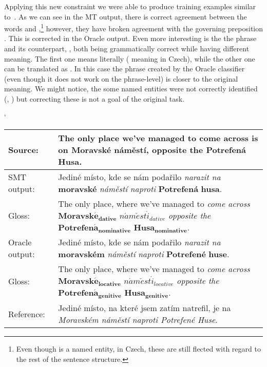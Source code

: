 Applying this new constraint we were able to produce training examples similar to~.
As we can see in the MT output, there is correct agreement between the words  and ,\footnote{
Even though  is a named entity, in Czech, these are still flected with regard to the rest of the sentence
structure.} however, they have broken agreement with the governing preposition . This is corrected in the Oracle output.
Even more interesting is the the phrase  and its counterpart, ,
both being grammatically correct while having different meaning. The first one means literally 
( meaning  in Czech), while the other one can be translated as .
In this case the phrase created by the Oracle classifier (even though it does not work on the phrase-level) is closer
to the original meaning. We might notice, the some named entities were not correctly identified (, ) but
correcting these is not a goal of the original task.

\begin{myexample}
    \small
    \catcode`
    \begin{center}
    \begin{tabular}{|l|p{}|}
    \hline
    \textbf{Source:}  &  \textbf{The only place we've managed to come across is on Moravské náměstí, opposite the Potrefená Husa.}  \\
    \hline
    SMT output:  &  Jediné místo, kde se nám podařilo \textit{narazit na} \textbf{moravské} \textit{náměstí} \textit{naproti} \textbf{Potrefená} \textbf{husa}.  \\
    \hline
    Gloss:  &  The only place, where we've managed to \textit{come across} $\mathbf{Moravsk\acute{e}_{dative}}$ $\mathit{n\acute{a}m\check{e}st\acute{i}_{dative}}$ \textit{opposite the} $\mathbf{Potrefen\acute{a}_{nominative}}$ $\mathbf{Husa_{nominative}}$. \\
    \hline
    Oracle output:  &  Jediné místo, kde se nám podařilo \textit{narazit na} \textbf{moravském} \textit{náměstí} \textit{naproti} \textbf{Potrefené} \textbf{huse}.  \\
    \hline
    Gloss:  &  The only place, where we've managed to \textit{come across} $\mathbf{Moravsk\acute{e}_{locative}}$ $\mathit{n\acute{a}m\check{e}st\acute{i}_{locative}}$ \textit{opposite the} $\mathbf{Potrefen\acute{a}_{genitive}}$ $\mathbf{Husa_{genitive}}$.  \\
    \hline
    Reference:  &  Jediné místo, na které jsem zatím natrefil, je na \textit{Moravském náměstí naproti Potrefené Huse}.  \\
    \hline
    \end{tabular}
    \label{ex-oracle-parentmark}
    \end{center}
\end{myexample}

